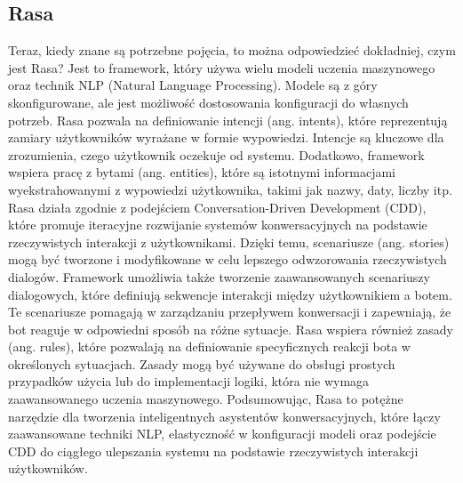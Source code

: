 \documentclass{article}
\begin{document}
\subsection{Rasa}
Teraz, kiedy znane są potrzebne pojęcia, to można odpowiedzieć dokładniej, czym
jest Rasa? Jest to framework, który używa wielu modeli uczenia maszynowego oraz
technik NLP (Natural Language Processing). Modele są z góry skonfigurowane, ale
jest możliwość dostosowania konfiguracji do własnych potrzeb. Rasa pozwala na
definiowanie intencji (ang. intents), które reprezentują zamiary użytkowników
wyrażane w formie wypowiedzi. Intencje są kluczowe dla zrozumienia, czego
użytkownik oczekuje od systemu. Dodatkowo, framework wspiera pracę z bytami
(ang. entities), które są istotnymi informacjami wyekstrahowanymi z wypowiedzi
użytkownika, takimi jak nazwy, daty, liczby itp. Rasa działa zgodnie z
podejściem Conversation-Driven Development (CDD), które promuje iteracyjne
rozwijanie systemów konwersacyjnych na podstawie rzeczywistych interakcji z
użytkownikami. Dzięki temu, scenariusze (ang. stories) mogą być tworzone i
modyfikowane w celu lepszego odwzorowania rzeczywistych dialogów. Framework
umożliwia także tworzenie zaawansowanych scenariuszy dialogowych, które
definiują sekwencje interakcji między użytkownikiem a botem. Te scenariusze
pomagają w zarządzaniu przepływem konwersacji i zapewniają, że bot reaguje w
odpowiedni sposób na różne sytuacje. Rasa wspiera również zasady (ang. rules),
które pozwalają na definiowanie specyficznych reakcji bota w określonych
sytuacjach. Zasady mogą być używane do obsługi prostych przypadków użycia lub
do implementacji logiki, która nie wymaga zaawansowanego uczenia maszynowego.
Podsumowując, Rasa to potężne narzędzie dla tworzenia inteligentnych asystentów
konwersacyjnych, które łączy zaawansowane techniki NLP, elastyczność w
konfiguracji modeli oraz podejście CDD do ciągłego ulepszania systemu na
podstawie rzeczywistych interakcji użytkowników.
\end{document}
